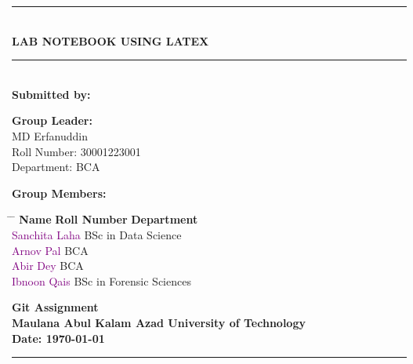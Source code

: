 \documentclass[12pt,a4paper]{article}
\begin{document}
	
	\begin{titlepage}
		\centering
		\vspace*{2cm}
		
		\noindent\rule{\textwidth}{1pt}\\[0.5cm]
		
		{\Huge\textbf{\color{blue}LAB NOTEBOOK USING LATEX}}\\
		\vspace{0.5cm}
		\noindent\rule{\textwidth}{1pt}\\[2cm]
		
		\Large\textbf{Submitted by:}\\
		\vspace{0.5cm}
		
		\textbf{\color{red}Group Leader:}\\
		\vspace{0.3cm}
		\Large MD Erfanuddin\\
		\large Roll Number: 30001223001\\
		Department: BCA\\
		
		\vspace{1.5cm}
		
		\textbf{\color{green}Group Members:}\\
		\vspace{0.5cm}
		
		\large
		\begin{tabbing}
			\hspace{4cm} \= \hspace{8cm} \= \kill
			\textbf{Name} \> \textbf{Roll Number} \> \textbf{Department} \\
			\textcolor{purple}{Sanchita Laha}  \> BSc in Data Science \\
			\textcolor{purple}{Arnov Pal}  \> BCA \\
			\textcolor{purple}{Abir Dey}  \> BCA \\
			\textcolor{purple}{Ibnoon Qais}  \> BSc in Forensic Sciences \\
		\end{tabbing}
		
		\vfill
		
		\Large\textbf{\color{orange}Git Assignment}\\
		\Large\textbf{\color{blue}Maulana Abul Kalam Azad University of Technology}\\
		\vspace{0.5cm}
		\Large\textbf{Date: \today}
		
		\vspace{2cm}
		\noindent\rule{\textwidth}{1pt}
		
	\end{titlepage}
	
\end{document}
